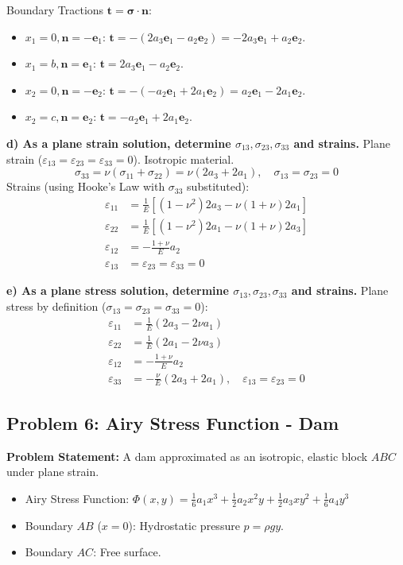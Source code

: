 \documentclass[10pt,twocolumn, a4paper]{article}
\begin{document}
Boundary Tractions $\bm{t} = \bm{\sigma} \cdot \bm{n}$:
\begin{itemize}
    \item $x_1 = 0, \bm{n} = -\bm{e}_1$: $\bm{t} = - (2a_3 \bm{e}_1 - a_2 \bm{e}_2) = -2a_3 \bm{e}_1 + a_2 \bm{e}_2$.
    \item $x_1 = b, \bm{n} = \bm{e}_1$: $\bm{t} = 2a_3 \bm{e}_1 - a_2 \bm{e}_2$.
    \item $x_2 = 0, \bm{n} = -\bm{e}_2$: $\bm{t} = - (-a_2 \bm{e}_1 + 2a_1 \bm{e}_2) = a_2 \bm{e}_1 - 2a_1 \bm{e}_2$.
    \item $x_2 = c, \bm{n} = \bm{e}_2$: $\bm{t} = -a_2 \bm{e}_1 + 2a_1 \bm{e}_2$.
\end{itemize}

\textbf{d) As a plane strain solution, determine $\sigma_{13}, \sigma_{23}, \sigma_{33}$ and strains.}
Plane strain ($\varepsilon_{13}=\varepsilon_{23}=\varepsilon_{33}=0$). Isotropic material.
\[ \sigma_{33} = \nu(\sigma_{11} + \sigma_{22}) = \nu(2a_3 + 2a_1), \quad \sigma_{13} = \sigma_{23} = 0 \]
Strains (using Hooke's Law with $\sigma_{33}$ substituted):
\begin{align*}
    \varepsilon_{11} &= \frac{1}{E}[(1-\nu^2)2a_3 - \nu(1+\nu)2a_1] \\
    \varepsilon_{22} &= \frac{1}{E}[(1-\nu^2)2a_1 - \nu(1+\nu)2a_3] \\
    \varepsilon_{12} &= -\frac{1+\nu}{E} a_2 \\
    \varepsilon_{13} &= \varepsilon_{23} = \varepsilon_{33} = 0
\end{align*}

\textbf{e) As a plane stress solution, determine $\sigma_{13}, \sigma_{23}, \sigma_{33}$ and strains.}
Plane stress by definition ($\sigma_{13}=\sigma_{23}=\sigma_{33}=0$):
\begin{align*}
    \varepsilon_{11} &= \frac{1}{E}(2a_3 - 2\nu a_1) \\
    \varepsilon_{22} &= \frac{1}{E}(2a_1 - 2\nu a_3) \\
    \varepsilon_{12} &= -\frac{1+\nu}{E} a_2 \\
    \varepsilon_{33} &= -\frac{\nu}{E}(2a_3 + 2a_1), \quad \varepsilon_{13} = \varepsilon_{23} = 0
\end{align*}



\subsection{Problem 6: Airy Stress Function - Dam}
\textbf{Problem Statement:}
A dam approximated as an isotropic, elastic block $ABC$ under plane strain.
\begin{itemize}
    \item Airy Stress Function: $\Phi(x, y) = \frac{1}{6}a_1 x^3 + \frac{1}{2}a_2 x^2 y + \frac{1}{2}a_3 x y^2 + \frac{1}{6}a_4 y^3$
    \item Boundary $AB$ ($x=0$): Hydrostatic pressure $p = \rho g y$.
    \item Boundary $AC$: Free surface.
\end{itemize}
\end{document}
